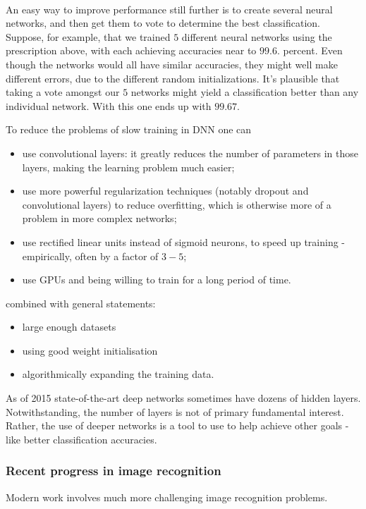 \paragraph{} An easy way to improve performance still further is to create several neural networks, and then get them to vote to determine the best classification. Suppose, for example, that we trained $5$ different neural networks using the prescription above, with each achieving accuracies near to $99.6$. percent. Even though the networks would all have similar accuracies, they might well make different errors, due to the different random initializations. It's plausible that taking a vote amongst our $5$ networks might yield a classification better than any individual network. With this one ends up with $99.67$.

To reduce the problems of slow training  in DNN one can
\begin{itemize}
\item use convolutional layers: it greatly reduces the number of parameters in those layers, making the learning problem much easier; 
\item use more powerful regularization techniques (notably dropout and convolutional layers) to reduce overfitting, which is otherwise more of a problem in more complex networks;
\item use rectified linear units instead of sigmoid neurons, to speed up training - empirically, often by a factor of $3-5$; 
\item use GPUs and being willing to train for a long period of time. 
\end{itemize}
combined with general statements:
\begin{itemize}
\item large enough datasets
\item using good weight initialisation
\item algorithmically expanding the training data.
\end{itemize}

As of 2015 state-of-the-art deep networks sometimes have dozens of hidden layers. Notwithstanding,  the number of layers is not of primary fundamental interest. Rather, the use of deeper networks is a tool to use to help achieve other goals - like better classification accuracies.

\subsubsection{Recent progress in image recognition}
Modern work involves much more challenging image recognition problems.



